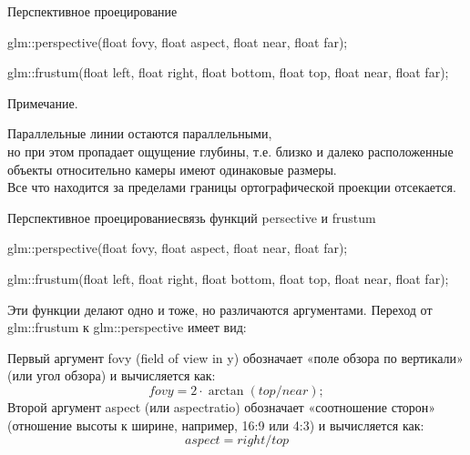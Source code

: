 \documentclass{beamer}
\begin{document}
	\begin{frame}{Перспективное проецирование}

		glm::perspective(float fovy, float aspect, float near, float far);
		
		glm::frustum(float left, float right, float bottom, float top, float near, float far);

		Примечание.

		Параллельные линии остаются параллельными,
		\\ но при этом пропадает ощущение глубины, т.е. близко и далеко расположенные объекты относительно камеры имеют одинаковые размеры.
		\\ Все что находится за пределами границы ортографической проекции отсекается.
	\end{frame}

	\begin{frame}{Перспективное проецирование}{связь функций persective и frustum}

		
		glm::perspective(float fovy, float aspect, float near, float far);
		
		glm::frustum(float left, float right, float bottom, float top, float near, float far);
		
		Эти функции делают одно и тоже, но различаются аргументами.
		Переход от glm::frustum к glm::perspective имеет вид:

		Первый аргумент fovy  (field of view in y) обозначает «поле обзора по вертикали» (или угол обзора) и вычисляется как:
		\[
			fovy = 2 \cdot \arctan (top / near);
		\]
		Второй аргумент aspect (или aspectratio) обозначает «соотношение сторон» (отношение высоты к ширине, например, 16:9 или 4:3) и вычисляется как:
		\[
			aspect =  right / top
		\]
		

	\end{frame}
\end{document}
